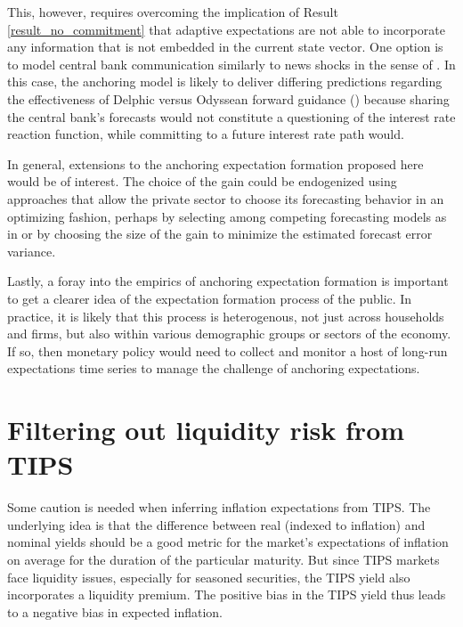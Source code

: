 \documentclass[11pt]{article}
\def \myBibPath {../../literature/}
\renewcommand{\[}{\begin{equation}}
\renewcommand{\]}{\end{equation}}
\begin{document}
This, however, requires overcoming the implication of Result \ref{result_no_commitment} that adaptive expectations are not able to incorporate any information that is not embedded in the current state vector. One option is to model central bank communication similarly to news shocks in the sense of \cite{beaudry2006stock}. In this case, the anchoring model is likely to deliver differing predictions regarding the effectiveness of Delphic versus Odyssean forward guidance (\cite{campbell2012macroeconomic}) because sharing the central bank's forecasts would not constitute a questioning of the interest rate reaction function, while committing to a future interest rate path would.

In general, extensions to the anchoring expectation formation proposed here would be of interest. The choice of the gain could be endogenized using approaches that allow the private sector to choose its forecasting behavior in an optimizing fashion, perhaps by selecting among competing forecasting models as in \cite{Branch2011} or by choosing the size of the gain to minimize the estimated forecast error variance. 

Lastly, a foray into the empirics of anchoring expectation formation is important to get a clearer idea of the expectation formation process of the public. In practice, it is likely that this process is heterogenous, not just across households and firms, but also within various demographic groups or sectors of the economy. If so, then monetary policy would need to collect and monitor a host of long-run expectations time series to manage the challenge of anchoring expectations. 



\clearpage
\newpage



\newpage
\appendix


\section{Filtering out liquidity risk from TIPS}\label{TIPS} 
Some caution is needed when inferring inflation expectations from TIPS. The underlying idea is that the difference between real (indexed to inflation) and nominal yields should be a good metric for the market's expectations of inflation on average for the duration of the particular maturity. But since TIPS markets face liquidity issues, especially for seasoned securities, the TIPS yield also incorporates a liquidity premium. The positive bias in the TIPS yield thus leads to a negative bias in expected inflation.
\end{document}
